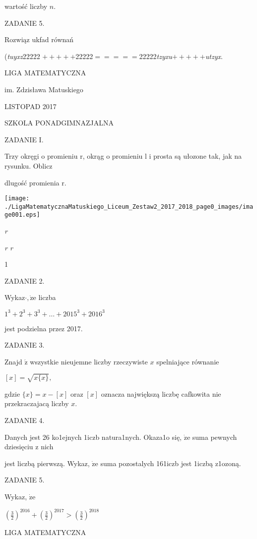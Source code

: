 \documentclass[a4paper,12pt]{article}
\begin{document}
wartość liczby $n.$

ZADANIE 5.

Rozwiąz ukfad równań

({\it tuyxz}22222 $+++++$22222$=====$22222{\it tzyxu}$+++++${\it utzyx}.






LIGA MATEMATYCZNA

im. Zdzisława Matuskiego

LISTOPAD 2017

SZKOLA PONADGIMNAZJALNA

ZADANIE I.

Trzy okręgi o promieniu r, okrąg o promieniu l i prosta są ułozone tak, jak na rysunku. Oblicz

dlugość promienia r.
\begin{center}
\texttt{[image: ./LigaMatematycznaMatuskiego\_Liceum\_Zestaw2\_2017\_2018\_page0\_images/image001.eps]}
\end{center}
{\it r}

{\it r  r}

1

ZADANIE 2.

Wykaz$\cdot, \dot{\mathrm{z}}\mathrm{e}$ liczba

$1^{3}+2^{3}+3^{3}+\ldots+2015^{3}+2016^{3}$

jest podzielna przez 2017.

ZADANIE 3.

Znajd $\acute{\mathrm{z}}$ wszystkie nieujemne liczby rzeczywiste $x$ spelniające równanie

$[x]=\sqrt{x\{x\}},$

gdzie $\{x\}=x-[x]$ oraz $[x]$ oznacza największą liczbę cafkowita nie przekraczajacą liczby $x.$

ZADANIE 4.

Danych jest 26 ko1ejnych 1iczb natura1nych. Okaza1o się, $\dot{\mathrm{z}}\mathrm{e}$ suma pewnych dziesięciu z nich

jest liczbą pierwszą. Wykaz, $\dot{\mathrm{z}}\mathrm{e}$ suma pozostalych 161iczb jest 1iczbą z1ozoną.

ZADANIE 5.

Wykaz, $\dot{\mathrm{z}}\mathrm{e}$

$(\displaystyle \frac{3}{2})^{2016}+(\frac{3}{2})^{2017}>(\frac{3}{2})^{2018}$






LIGA MATEMATYCZNA
\end{document}
